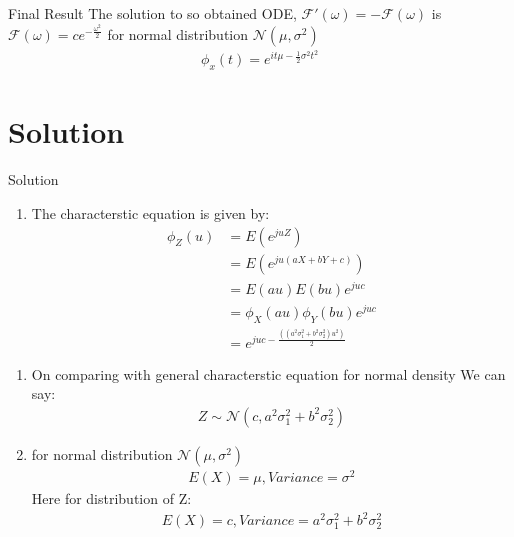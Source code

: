 \documentclass{beamer}
\providecommand{\e}[1]{\ensuremath{E\left(#1\right)}}
\providecommand{\brak}[1]{\ensuremath{\left(#1\right)}}
\newcounter{saveenumi}
\newcommand{\seti}{\setcounter{saveenumi}{\value{enumi}}}
\newcommand{\conti}{\setcounter{enumi}{\value{saveenumi}}}
\begin{document}
\begin{frame}{}
\begin{block}{Final Result}
The solution to so obtained ODE, $\mathcal{F}'\brak{\omega}=-\mathcal{F}\brak{\omega}$ is\\$\mathcal{F}\brak{\omega}=ce^{-\frac{\omega^2}{2}}$
for normal distribution $\mathcal{N}\brak{\mu,\sigma^2}$ 
\begin{align}
\phi_x\brak{t}=e^{it\mu-\frac{1}{2}\sigma^2t^2}
\end{align}
\end{block}
\end{frame}
\section{Solution}
\begin{frame}{Solution}
\begin{enumerate}
\item The characterstic equation is given by:
\begin{align}
\phi_Z \brak{u} &=\e{e^{juZ}} \\
                &=\e{e^{ju(aX+bY+c)}} \\
                &=\e{au}\e{bu}e^{juc} \\
                &=\phi_X \brak{au}\phi_Y \brak{bu}e^{juc} \\
                &=e^{juc-\frac{\brak{(a^2\sigma_1^2+b^2\sigma_2^2)u^2}}{2}}
\end{align}
\seti
\end{enumerate}
\end{frame}{}
\begin{enumerate}
\conti
\item On comparing with  general characterstic equation for normal density We can say: 
\begin{align}
Z \sim \mathcal{N}\brak{c,a^2\sigma_1^2+b^2\sigma_2^2}
\end{align}
\item for normal distribution $\mathcal{N}\brak{\mu,\sigma^2}$ 
\begin{align}
\e{X}=\mu,Variance=\sigma^2
\end{align}
Here for distribution of Z:
\begin{align}
\e{X}=c,Variance=a^2\sigma_1^2+b^2\sigma_2^2
\end{align}
\end{enumerate}
\end{document}
